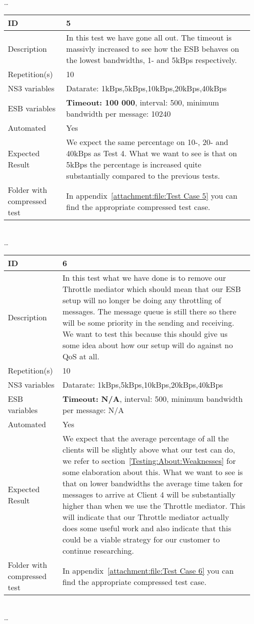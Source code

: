\begin{center}
\\ \ldots \\

\begin{tabular}{| p{4cm} | p{8cm} |}%
	\hline
	ID & 5 \\
	\hline
	Description & In this test we have gone all out. The timeout is massivly increased to see how the ESB behaves on the lowest bandwidths, 1- and 5kBps respectively.  \\
	\hline
	Repetition(s) & 10 \\
	\hline
	NS3 variables & Datarate: 1kBps,5kBps,10kBps,20kBps,40kBps \\
	\hline
	ESB variables & \textbf{Timeout: 100 000}, interval: 500, minimum bandwidth per message: 10240 \\
	\hline
	Automated & Yes \\
	\hline
	Expected Result & We expect the same percentage on 10-, 20- and 40kBps as Test 4. What we want to see is that on 5kBps the percentage is increased quite substantially compared to the previous tests. \\
	\hline
	Folder with compressed test & In appendix~\ref{attachment:file:Test Case 5} you can find the appropriate compressed test case.\\
	\hline
\end{tabular}
\\ \ldots \\
\begin{tabular}{| p{4cm} | p{8cm} |}%
	\hline
	ID & 6 \\
	\hline
	Description & In this test what we have done is to remove our Throttle mediator which should mean that our ESB setup will no longer be doing any throttling of messages. The message queue is still there so there will be some priority in the sending and receiving. We want to test this because this should give us some idea about how our setup will do against no QoS at all. \\
	\hline
	Repetition(s) & 10 \\
	\hline
	NS3 variables & Datarate: 1kBps,5kBps,10kBps,20kBps,40kBps \\
	\hline
	ESB variables & \textbf{Timeout: N/A}, interval: 500, minimum bandwidth per message: N/A \\
	\hline
	Automated & Yes \\
	\hline
	Expected Result & We expect that the average percentage of all the clients will be slightly above what our test can do, we refer to section~\ref{Testing:About:Weaknesses} for some elaboration about this. What we want to see is that on lower bandwidths the average time taken for messages to arrive at Client 4 will be substantially higher than when we use the Throttle mediator. This will indicate that our Throttle mediator actually does some useful work and also indicate that this could be a viable strategy for our customer to continue researching. \\
	\hline
	Folder with compressed test & In appendix~\ref{attachment:file:Test Case 6} you can find the appropriate compressed test case. \\
	\hline
\end{tabular}

\\ \ldots \\

\end{center}
